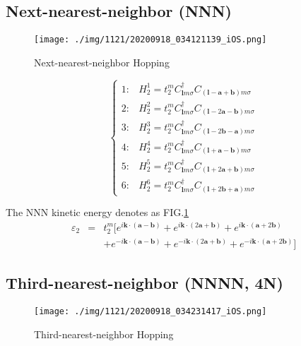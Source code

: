 \documentclass[reprint, aps, prb, showkeys]{revtex4-2}
\begin{document}
\subsection{Next-nearest-neighbor (NNN)}
\begin{figure}[t]
    \texttt{[image: ./img/1121/20200918\_034121139\_iOS.png]}
    \caption{\label{fig:NNN}Next-nearest-neighbor Hopping}
\end{figure}

\begin{equation}
    \begin{cases}
        1: & H_2^1 = t_2^m C_{\boldsymbol{l}m\sigma}^{\dagger}C_{(\boldsymbol{l}-\boldsymbol{a}+\boldsymbol{b})m\sigma}\\
        2: & H_2^2 = t_2^m C_{\boldsymbol{l}m\sigma}^{\dagger}C_{(\boldsymbol{l}-2\boldsymbol{a}-\boldsymbol{b})m\sigma}\\
        3: & H_2^3 = t_2^m C_{\boldsymbol{l}m\sigma}^{\dagger}C_{(\boldsymbol{l}-2\boldsymbol{b}-\boldsymbol{a})m\sigma}\\
        4: & H_2^4 = t_2^m C_{\boldsymbol{l}m\sigma}^{\dagger}C_{(\boldsymbol{l}+\boldsymbol{a}-\boldsymbol{b})m\sigma}\\
        5: & H_2^5 = t_2^m C_{\boldsymbol{l}m\sigma}^{\dagger}C_{(\boldsymbol{l}+2\boldsymbol{a}+\boldsymbol{b})m\sigma}\\
        6: & H_2^6 = t_2^m C_{\boldsymbol{l}m\sigma}^{\dagger}C_{(\boldsymbol{l}+2\boldsymbol{b}+\boldsymbol{a})m\sigma}
     \end{cases} \label{NNN}
\end{equation}

The NNN kinetic energy denotes as FIG.\ref{fig:NNN}
\begin{eqnarray}
    \varepsilon_2 &=& t_2^m[e^{i \boldsymbol{k} \cdot (\boldsymbol{a} - \boldsymbol{b})}+e^{i \boldsymbol{k} \cdot (2\boldsymbol{a} + \boldsymbol{b})}+e^{i \boldsymbol{k} \cdot (\boldsymbol{a} + 2\boldsymbol{b})} \nonumber\\
    &&+e^{-i \boldsymbol{k} \cdot (\boldsymbol{a} - \boldsymbol{b})}+e^{-i \boldsymbol{k} \cdot (2\boldsymbol{a} + \boldsymbol{b})}+e^{-i \boldsymbol{k} \cdot (\boldsymbol{a} + 2\boldsymbol{b})}] \label{NNNhopping}
\end{eqnarray}

\subsection{Third-nearest-neighbor (NNNN, 4N)}
\begin{figure}[b]
    \texttt{[image: ./img/1121/20200918\_034231417\_iOS.png]}
    \caption{\label{fig:NNNN}Third-nearest-neighbor Hopping}
\end{figure}
\end{document}
